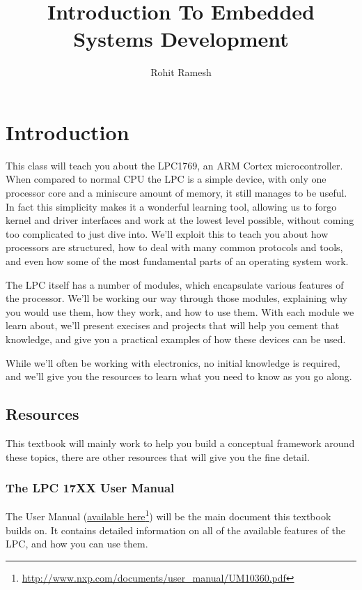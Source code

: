 \documentclass[]{article}
\title{Introduction To Embedded Systems Development}
\author{Rohit Ramesh}
\date{}
\begin{document}
\maketitle

{
\hypersetup{linkcolor=black}
\setcounter{tocdepth}{2}
\tableofcontents
}
\newpage

\section{Introduction}

This class will teach you about the LPC1769, an ARM Cortex
microcontroller. When compared to normal CPU the LPC is a simple device,
with only one processor core and a miniscure amount of memory, it still
manages to be useful. In fact this simplicity makes it a wonderful
learning tool, allowing us to forgo kernel and driver interfaces and
work at the lowest level possible, without coming too complicated to
just dive into. We'll exploit this to teach you about how processors are
structured, how to deal with many common protocols and tools, and even
how some of the most fundamental parts of an operating system work.

The LPC itself has a number of modules, which encapsulate various
features of the processor. We'll be working our way through those
modules, explaining why you would use them, how they work, and how to
use them. With each module we learn about, we'll present execises and
projects that will help you cement that knowledge, and give you a
practical examples of how these devices can be used.

While we'll often be working with electronics, no initial knowledge is
required, and we'll give you the resources to learn what you need to
know as you go along.

\subsection{Resources}

This textbook will mainly work to help you build a conceptual framework
around these topics, there are other resources that will give you the
fine detail.

\subsubsection{The LPC 17XX User Manual}

The User Manual
(\href{http://www.nxp.com/documents/user_manual/UM10360.pdf}{available
here}\footnote{\url{http://www.nxp.com/documents/user_manual/UM10360.pdf}})
will be the main document this textbook builds on. It contains detailed
information on all of the available features of the LPC, and how you can
use them.
\end{document}
